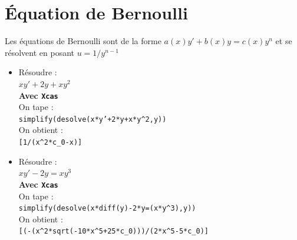 \documentclass[a4paper,11pt]{book}
\begin{document}
\section{\'Equation de Bernoulli}
Les \'equations de Bernoulli sont de la forme $a(x)y'+b(x)y=c(x)y^n$ et se 
r\'esolvent en posant $u=1/y^{n-1}$
\begin{itemize}
\item  R\'esoudre :\\
$xy'+2y+xy^2$\\
{\bf Avec {\tt Xcas}}\\
On tape :\\
{\tt simplify(desolve(x*y'+2*y+x*y\verb|^|2,y))}\\
On obtient :\\
{\tt [1/(x\verb|^|2*c\_0-x)]}

\item  R\'esoudre :\\
$xy'-2y=xy^3$\\
{\bf Avec {\tt Xcas}}\\
On tape :\\
{\tt simplify(desolve(x*diff(y)-2*y=(x*y\verb|^|3),y))}\\
On obtient :\\
{\tt [(-(x\verb|^|2*sqrt(-10*x\verb|^|5+25*c\_0)))/(2*x\verb|^|5-5*c\_0)]}
\end{itemize}
\end{document}
